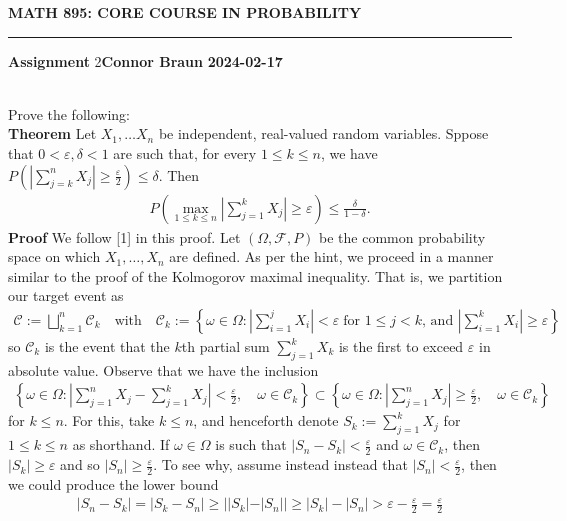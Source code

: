 \documentclass[10pt]{article}
\newcommand{\bp}[1]{\left({#1}\right)}
\newcommand{\1}[1]{\mathbbm{1}_{#1}}
\newcommand{\mc}[1]{\mathcal{#1}}
\begin{document}
    \begin{center}
        {\bf\large{MATH 895: CORE COURSE IN PROBABILITY}}
        \smallskip
        \hrule
        \smallskip
        {\bf Assignment} 2\hfill {\bf Connor Braun} \hfill {\bf 2024-02-17}
    \end{center}
    \\[5pt]
    Prove the following:\\[5pt]
    {\bf Theorem}\hspace{5pt} Let $X_1,\dots X_n$ be independent, real-valued random variables. Sppose that $0<\varepsilon,\delta<1$ are such that, for every $1\leq k\leq n$, we have
    $P\bp{\left|\sum_{j=k}^nX_j\right|\geq \frac{\varepsilon}{2}}\leq \delta$. Then
    \begin{align*}
        P\bp{\max_{1\leq k\leq n}\left|\sum_{j=1}^kX_j\right|\geq \varepsilon}\leq \frac{\delta}{1-\delta}.
    \end{align*}
    {\bf Proof}\hspace{5pt} We follow [1] in this proof. Let $(\Omega,\mc{F},P)$ be the common probability space on which $X_1,\dots, X_n$ are defined. As per the hint, we proceed in a manner similar to the proof of the Kolmogorov maximal inequality. That is, we partition our target event as
    \begin{align*}
        \mc{C}:=\bigsqcup_{k=1}^n\mc{C}_k\quad\text{with}\quad \mc{C}_k:=\left\{\omega\in\Omega:\left|\sum_{i=1}^jX_i\right|<\varepsilon\;\text{for $1\leq j<k$, and }\left|\sum_{i=1}^kX_i\right|\geq\varepsilon\right\}
    \end{align*}
    so $\mc{C}_k$ is the event that the $k$th partial sum $\sum_{j=1}^kX_k$ is the first to exceed $\varepsilon$ in absolute value. Observe that we have the inclusion
    \begin{align*}
        \left\{\omega\in\Omega:\left|\sum_{j=1}^{n}X_j-\sum_{j=1}^kX_j\right|<\frac{\varepsilon}{2},\quad\omega\in\mc{C}_k\right\}\subset\left\{\omega\in\Omega:\left|\sum_{j=1}^nX_j\right|\geq\frac{\varepsilon}{2},\quad\omega\in\mc{C}_k\right\}\tag{4}
    \end{align*}
    for $k\leq n$. For this, take $k\leq n$, and henceforth denote $S_k:=\sum_{j=1}^kX_j$ for $1\leq k\leq n$ as shorthand. If $\omega\in\Omega$ is such that $|S_n-S_k|<\tfrac{\varepsilon}{2}$ and $\omega\in\mc{C}_k$, then $|S_k|\geq\varepsilon$ and so $|S_n|\geq\tfrac{\varepsilon}{2}$. To see why, assume instead instead that $|S_n|<\tfrac{\varepsilon}{2}$, then we could produce the lower bound
    \begin{align*}
        \left|S_n-S_k\right|=\left|S_k-S_n\right|\geq ||S_k|-|S_n||\geq |S_k|-|S_n|>\varepsilon-\frac{\varepsilon}{2}=\frac{\varepsilon}{2}
    \end{align*}
\end{document}
